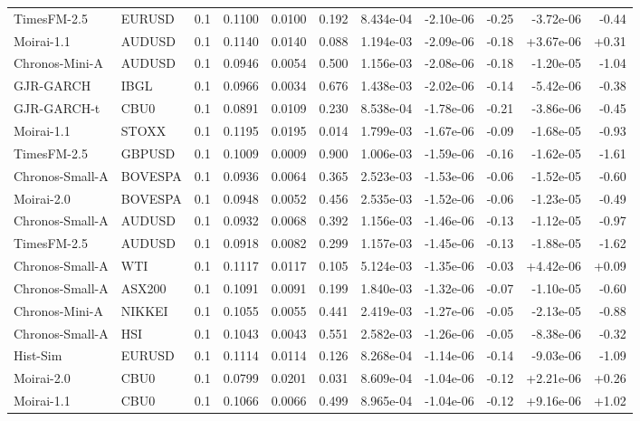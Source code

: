 \begin{tabular}{llrrrrrrrrr}
TimesFM-2.5 & EURUSD & 0.1 & 0.1100 & 0.0100 & 0.192 & 8.434e-04 & -2.10e-06 & -0.25 & -3.72e-06 & -0.44 \\
Moirai-1.1 & AUDUSD & 0.1 & 0.1140 & 0.0140 & 0.088 & 1.194e-03 & -2.09e-06 & -0.18 & +3.67e-06 & +0.31 \\
Chronos-Mini-A & AUDUSD & 0.1 & 0.0946 & 0.0054 & 0.500 & 1.156e-03 & -2.08e-06 & -0.18 & -1.20e-05 & -1.04 \\
GJR-GARCH & IBGL & 0.1 & 0.0966 & 0.0034 & 0.676 & 1.438e-03 & -2.02e-06 & -0.14 & -5.42e-06 & -0.38 \\
GJR-GARCH-t & CBU0 & 0.1 & 0.0891 & 0.0109 & 0.230 & 8.538e-04 & -1.78e-06 & -0.21 & -3.86e-06 & -0.45 \\
Moirai-1.1 & STOXX & 0.1 & 0.1195 & 0.0195 & 0.014 & 1.799e-03 & -1.67e-06 & -0.09 & -1.68e-05 & -0.93 \\
TimesFM-2.5 & GBPUSD & 0.1 & 0.1009 & 0.0009 & 0.900 & 1.006e-03 & -1.59e-06 & -0.16 & -1.62e-05 & -1.61 \\
Chronos-Small-A & BOVESPA & 0.1 & 0.0936 & 0.0064 & 0.365 & 2.523e-03 & -1.53e-06 & -0.06 & -1.52e-05 & -0.60 \\
Moirai-2.0 & BOVESPA & 0.1 & 0.0948 & 0.0052 & 0.456 & 2.535e-03 & -1.52e-06 & -0.06 & -1.23e-05 & -0.49 \\
Chronos-Small-A & AUDUSD & 0.1 & 0.0932 & 0.0068 & 0.392 & 1.156e-03 & -1.46e-06 & -0.13 & -1.12e-05 & -0.97 \\
TimesFM-2.5 & AUDUSD & 0.1 & 0.0918 & 0.0082 & 0.299 & 1.157e-03 & -1.45e-06 & -0.13 & -1.88e-05 & -1.62 \\
Chronos-Small-A & WTI & 0.1 & 0.1117 & 0.0117 & 0.105 & 5.124e-03 & -1.35e-06 & -0.03 & +4.42e-06 & +0.09 \\
Chronos-Small-A & ASX200 & 0.1 & 0.1091 & 0.0091 & 0.199 & 1.840e-03 & -1.32e-06 & -0.07 & -1.10e-05 & -0.60 \\
Chronos-Mini-A & NIKKEI & 0.1 & 0.1055 & 0.0055 & 0.441 & 2.419e-03 & -1.27e-06 & -0.05 & -2.13e-05 & -0.88 \\
Chronos-Small-A & HSI & 0.1 & 0.1043 & 0.0043 & 0.551 & 2.582e-03 & -1.26e-06 & -0.05 & -8.38e-06 & -0.32 \\
Hist-Sim & EURUSD & 0.1 & 0.1114 & 0.0114 & 0.126 & 8.268e-04 & -1.14e-06 & -0.14 & -9.03e-06 & -1.09 \\
Moirai-2.0 & CBU0 & 0.1 & 0.0799 & 0.0201 & 0.031 & 8.609e-04 & -1.04e-06 & -0.12 & +2.21e-06 & +0.26 \\
Moirai-1.1 & CBU0 & 0.1 & 0.1066 & 0.0066 & 0.499 & 8.965e-04 & -1.04e-06 & -0.12 & +9.16e-06 & +1.02 \\

\end{tabular}
